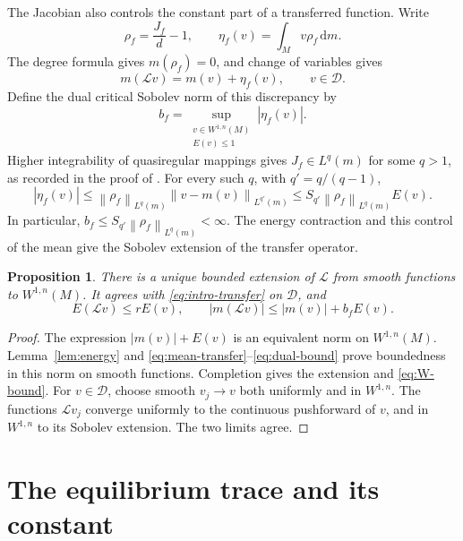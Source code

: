 \documentclass[11pt,reqno]{amsart}
\theoremstyle{plain}
\newtheorem{proposition}[theorem]{Proposition}
\theoremstyle{definition}
\theoremstyle{remark}
\newcommand{\E}{\mathbb E}
\newcommand{\Lop}{\mathcal L}
\newcommand{\Dcal}{\mathcal D}
\newcommand{\norm}[1]{\left\lVert #1\right\rVert}
\newcommand{\dd}{\mathrm d}
\numberwithin{equation}{section}
\begin{document}
The Jacobian also controls the constant part of a transferred function. Write
\begin{equation}\label{eq:rho}
 \rho_f=\frac{J_f}{d}-1,
 \qquad \eta_f(v)=\int_Mv\rho_f\,\dd m.
\end{equation}
The degree formula gives $m(\rho_f)=0$, and change of variables gives
\begin{equation}\label{eq:mean-transfer}
 m(\Lop v)=m(v)+\eta_f(v),\qquad v\in\Dcal.
\end{equation}
Define the dual critical Sobolev norm of this discrepancy by
\begin{equation}\label{eq:def-b}
 b_f=\sup_{\substack{v\in W^{1,n}(M)\\E(v)\le1}}|\eta_f(v)|.
\end{equation}
Higher integrability of quasiregular mappings gives $J_f\in L^q(m)$ for some $q>1$, as recorded in the proof of \cite[Proposition 3.1]{OP14}. For every such $q$, with $q'=q/(q-1)$,
\begin{equation}\label{eq:dual-bound}
 |\eta_f(v)|
 \le\norm{\rho_f}_{L^q(m)}\norm{v-m(v)}_{L^{q'}(m)}
 \le S_{q'}\norm{\rho_f}_{L^q(m)}E(v).
\end{equation}
In particular, $b_f\le S_{q'}\norm{\rho_f}_{L^q(m)}<\infty$. The energy contraction and this control of the mean give the Sobolev extension of the transfer operator.

\begin{proposition}\label{prop:L-sobolev}
There is a unique bounded extension of $\Lop$ from smooth functions to $W^{1,n}(M)$. It agrees with \eqref{eq:intro-transfer} on $\Dcal$, and
\begin{equation}\label{eq:W-bound}
 E(\Lop v)\le rE(v),\qquad
 |m(\Lop v)|\le |m(v)|+b_fE(v).
\end{equation}
\end{proposition}

\begin{proof}
The expression $|m(v)|+E(v)$ is an equivalent norm on $W^{1,n}(M)$. Lemma~\ref{lem:energy} and \eqref{eq:mean-transfer}--\eqref{eq:dual-bound} prove boundedness in this norm on smooth functions. Completion gives the extension and \eqref{eq:W-bound}. For $v\in\Dcal$, choose smooth $v_j\to v$ both uniformly and in $W^{1,n}$. The functions $\Lop v_j$ converge uniformly to the continuous pushforward of $v$, and in $W^{1,n}$ to its Sobolev extension. The two limits agree.
\end{proof}

\section{The equilibrium trace and its constant}\label{sec:trace}
\end{document}
